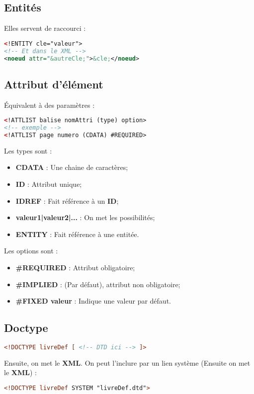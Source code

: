         \subsection{Entités}
            Elles servent de raccourci :
            \begin{lstlisting}[language=XML]
<!ENTITY cle="valeur">
<!-- Et dans le XML -->
<noeud attr="&autreCle;">&cle;</noeud>
            \end{lstlisting}
        \subsection{Attribut d'élément}
            Équivalent à des paramètres :
            \begin{lstlisting}[language=XML]
<!ATTLIST balise nomAttri (type) option>
<!-- exemple -->
<!ATTLIST page numero (CDATA) #REQUIRED>
            \end{lstlisting}
            Les types sont :
            \begin{itemize}
                \item \textbf{CDATA} : Une chaine de caractères;
                \item \textbf{ID} : Attribut unique;
                \item \textbf{IDREF} : Fait référence à un \textbf{ID};
                \item \textbf{valeur1|valeur2|...} : On met les possibilités;
                \item \textbf{ENTITY} : Fait référence à une entitée.
            \end{itemize}
            Les options sont :
            \begin{itemize}
                \item \textbf{\#REQUIRED} : Attribut obligatoire;
                \item \textbf{\#IMPLIED} : (Par défaut), attribut non obligatoire;
                \item \textbf{\#FIXED valeur} : Indique une valeur par défaut.
            \end{itemize}
        \subsection{Doctype}
            \begin{lstlisting}[language=XML]
<!DOCTYPE livreDef [ <!-- DTD ici --> ]>
            \end{lstlisting}
            Ensuite, on met le \textbf{XML}. On peut l'inclure par un lien système (Ensuite on met le \textbf{XML}) :
            \begin{lstlisting}[language=XML]
<!DOCTYPE livreDef SYSTEM "livreDef.dtd">
            \end{lstlisting}

